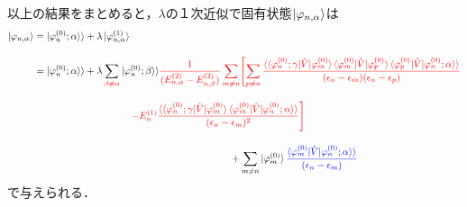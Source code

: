 以上の結果をまとめると，$\lambda$の１次近似で固有状態$\ket{\varphi_{n,\alpha}}$は
\begin{align}
    \ket{\varphi_{n,\alpha}}
    &=|\varphi^{(0)}_n;\alpha\rangle\rangle
    +\lambda \ket{\varphi_{n,\alpha}^{(1)}}\\[10pt]
    &=
    |\varphi^{(0)}_n;\alpha\rangle\rangle
    +\lambda\sum_{\textcolor{red}{\beta\neq\alpha}}|\varphi^{(0)}_n;\beta\rangle\rangle
    \textcolor{red}{\frac{1}{(E^{(2)}_{n,\alpha}-E^{(2)}_{n,\beta})}
    \sum_{m\neq n}\Biggl[\sum_{p\neq n}
    \frac{\langle\braket{\varphi^{(0)}_{n};\gamma|\hat{V}|\varphi^{(0)}_m}
    \langle{\varphi^{(0)}_{m}|\hat{V}|\varphi^{(0)}_p}\rangle
    \braket{\varphi^{(0)}_{p}|\hat{V}|\varphi^{(0)}_n;\alpha}\rangle}
    {(\epsilon_n-\epsilon_m)(\epsilon_n-\epsilon_p)}}\nn[10pt]
    &\hspace{100pt}
    \textcolor{red}{-E^{(1)}_n
    \frac{\langle\braket{\varphi^{(0)}_{n};\gamma|\hat{V}|\varphi^{(0)}_m}
    \braket{\varphi^{(0)}_{m}|\hat{V}|\varphi^{(0)}_n;\alpha}\rangle}{(\epsilon_n-\epsilon_m)^2}
    \Biggr]}
    \nn[10pt]
    &\hspace{200pt}+
    \sum_{m\neq n}\ket{\varphi^{(0)}_m}
    \textcolor{blue}{
    \frac{\braket{\varphi^{(0)}_{m}|\hat{V}|\varphi^{(0)}_n;\alpha}\rangle}{(\epsilon_n-\epsilon_m)}}
\end{align}
で与えられる．









